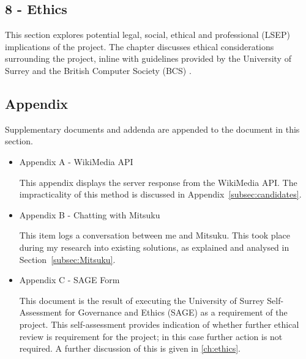 \subsection*{8 - Ethics}
This section explores potential legal, social, ethical and professional (LSEP) implications of the project. The chapter discusses ethical considerations surrounding the project, inline with guidelines provided by the University of Surrey \cite{surreyethics} and the British Computer Society (BCS) \cite{bcs2019conduct}.

\subsection*{Appendix}
Supplementary documents and addenda are appended to the document in this section.
\begin{itemize}
	\item Appendix A - WikiMedia API
	\par This appendix displays the server response from the WikiMedia API. The impracticality of this method is discussed in Appendix~\ref{subsec:candidates}.
	
	\item Appendix B - Chatting with Mitsuku
	\par This item logs a conversation between me and Mitsuku. This took place during my research into existing solutions, as explained and analysed in Section~\ref{subsec:Mitsuku}.
	
	\item Appendix C - SAGE Form
	\par This document is the result of executing the University of Surrey Self-Assessment for Governance and Ethics (SAGE) as a requirement of the project. This self-assessment provides indication of whether further ethical review is requirement for the project; in this case further action is not required. A further discussion of this is given in \ref{ch:ethics}.
\end{itemize}
